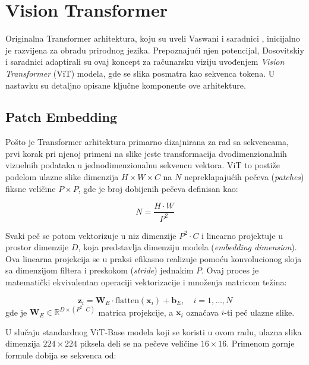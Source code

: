 \section{Vision Transformer}

Originalna Transformer arhitektura, koju su uveli Vaswani i saradnici \cite{vaswani2017attention}, inicijalno je razvijena za obradu prirodnog jezika. Prepoznajući njen potencijal, Dosovitskiy i saradnici \cite{dosovitskiy2021vit} adaptirali su ovaj koncept za računarsku viziju uvođenjem \textit{Vision Transformer} (ViT) modela, gde se slika posmatra kao sekvenca tokena. U nastavku su detaljno opisane ključne komponente ove arhitekture.

\subsection{Patch Embedding}
\label{sec:patch_emb}
Pošto je Transformer arhitektura primarno dizajnirana za rad sa sekvencama, prvi korak pri njenoj primeni na slike jeste transformacija dvodimenzionalnih vizuelnih podataka u jednodimenzionalnu sekvencu vektora. ViT to postiže podelom ulazne slike dimenzija $H \times W \times C$ na $N$ nepreklapajućih pečeva (\textit{patches}) fiksne veličine $P \times P$, gde je broj dobijenih pečeva definisan kao:

\begin{equation}
    N = \frac{H \cdot W}{P^2}
\end{equation}

Svaki peč se potom vektorizuje u niz dimenzije $P^2 \cdot C$ i linearno projektuje u prostor dimenzije $D$, koja predstavlja dimenziju modela (\textit{embedding dimension}). Ova linearna projekcija se u praksi efikasno realizuje pomoću konvolucionog sloja sa dimenzijom filtera i preskokom (\textit{stride}) jednakim $P$. Ovaj proces je matematički ekvivalentan operaciji vektorizacije i množenja matricom težina:

\begin{equation}
    \mathbf{z}_i = \mathbf{W}_E \cdot \text{flatten}(\mathbf{x}_i) + \mathbf{b}_E, 
    \quad i = 1, \ldots, N
\end{equation}
gde je $\mathbf{W}_E \in \mathbb{R}^{D \times (P^2 \cdot C)}$ matrica projekcije, a $\mathbf{x}_i$ označava $i$-ti peč ulazne slike.

U slučaju standardnog ViT-Base modela koji se koristi u ovom radu, ulazna slika dimenzija $224 \times 224$ piksela deli se na pečeve veličine $16 \times 16$. Primenom gornje formule dobija se sekvenca od:

